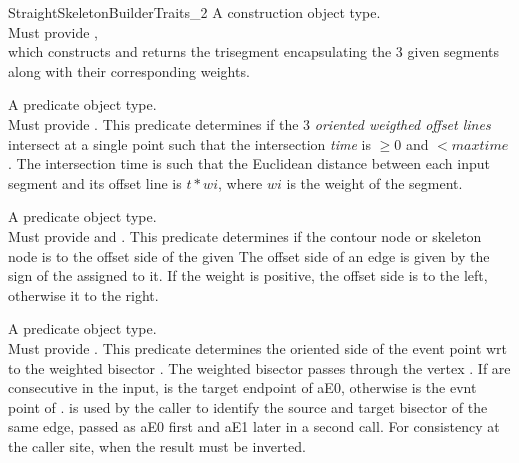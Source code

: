 \begin{ccRefConcept}{StraightSkeletonBuilderTraits_2}
{A construction object type.\\
Must provide , \\
which constructs and returns the trisegment encapsulating the 3 given segments along with their corresponding weights.}

{A predicate object type.\\
Must provide . 
This predicate determines if the 3 \textit{oriented weigthed offset lines} intersect at a single point such that the intersection \textit{time}  is $\geq 0$ and $< maxtime$.
The intersection time  is such that the Euclidean distance between each input segment and its offset line is $t*wi$, where $wi$ is the weight of the segment.\\
}

{A predicate object type.\\
Must provide 
and .
This predicate determines if the contour node  or skeleton node  is to the offset side of the given 
The offset side of an edge is given by the sign of the  assigned to it. If the weight is positive, the offset side is to the left, otherwise it to the right.
}

{A predicate object type.\\
Must provide .
This predicate determines the oriented side of the event point wrt to the weighted bisector \ccc{[aE0,aW0,aE0,aW1]}.
The weighted bisector passes through the vertex . If \ccc{[aE0,aE0]} are consecutive in the input,  is the target endpoint of aE0,
otherwise is the evnt point of .
 is used by the caller to identify the source and target bisector of the same edge, passed as aE0 first and aE1 later in a second call.
For consistency at the caller site, when  the result must be inverted.
}


\end{ccRefConcept}
